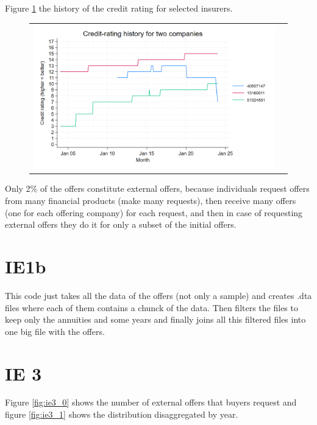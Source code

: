 \documentclass[12pt]{article}
\begin{document}
Figure \ref{fig:ie1_1} the history of the credit rating for selected insurers.  
\begin{figure}[H]
\caption{}
 \label{fig:ie1_1}
\centering{}%
\begin{tabular}{cc}
\includegraphics[scale=0.27]{../figures/IE1_credit_history.png}
\end{tabular}
\end{figure}

Only 2\% of the offers constitute external offers, because individuals request offers from many financial products (make many requests), then receive many offers (one for each offering company) for each request, and then in case of requesting external offers they do it for only a subset of the initial offers. 

\section{IE1b}

This code just takes all the data of the offers (not only a sample) and creates .dta files where each of them contains a chunck of the data. Then filters the files to keep only the annuities and some years and finally joins all this filtered files into one big file with the offers. 
 

\section{IE 3}

Figure \ref{fig:ie3_0} shows the number of external offers that buyers request and figure \ref{fig:ie3_1} shows the distribution disaggregated by year. 
\end{document}
